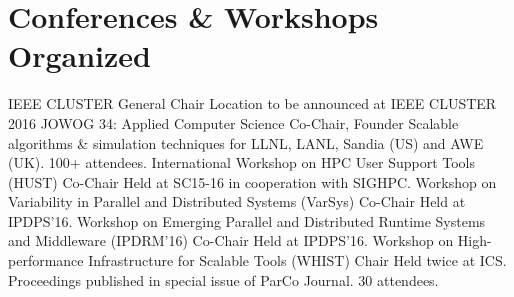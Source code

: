 \section{Conferences \& Workshops Organized}
        {IEEE CLUSTER}
        {General Chair}{}{}
        {Location to be announced at IEEE CLUSTER 2016}
		{JOWOG 34: Applied Computer Science}
		{Co-Chair, Founder}
		{}{}
		{Scalable algorithms \& simulation techniques for
		 LLNL, LANL, Sandia (US) and AWE (UK).  100+ attendees.}
		{International Workshop on HPC User Support Tools (HUST)}
		{Co-Chair}{}{}
		{Held at SC15-16 in cooperation with SIGHPC.}
		{Workshop on Variability in Parallel and Distributed Systems (VarSys)}
		{Co-Chair}{}{}
		{Held at IPDPS'16.}
        {Workshop on Emerging Parallel and Distributed Runtime Systems and Middleware\newline
         (IPDRM'16)}
		{Co-Chair}{}{}
		{Held at IPDPS'16.}
		{Workshop on High-performance Infrastructure for Scalable Tools (WHIST)}
		{Chair}{}{}
		{Held twice at ICS. Proceedings published in special issue of ParCo Journal. 30 attendees.}


